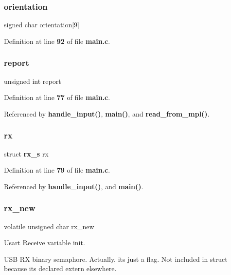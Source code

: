 \subsubsection{orientation}
{\footnotesize\ttfamily signed char orientation[9]}



Definition at line \textbf{ 92} of file \textbf{ main.\+c}.

\mbox{\label{group__eMPL_ga5ab95f126fb29c3c65d6f4aa4944a2f7}} 
\subsubsection{report}
{\footnotesize\ttfamily unsigned int report}



Definition at line \textbf{ 77} of file \textbf{ main.\+c}.



Referenced by \textbf{ handle\+\_\+input()}, \textbf{ main()}, and \textbf{ read\+\_\+from\+\_\+mpl()}.

\mbox{\label{group__eMPL_ga02c35d11f6cb2fd88475c231ddf6afce}} 
\subsubsection{rx}
{\footnotesize\ttfamily struct \textbf{ rx\+\_\+s} rx}



Definition at line \textbf{ 79} of file \textbf{ main.\+c}.



Referenced by \textbf{ handle\+\_\+input()}, and \textbf{ main()}.

\mbox{\label{group__eMPL_ga5bfb2c29b84492416fe0a885d4664132}} 
\subsubsection{rx\+\_\+new}
{\footnotesize\ttfamily volatile unsigned char rx\+\_\+new}



Usart Receive variable init. 

U\+SB RX binary semaphore. Actually, it\textquotesingle{}s just a flag. Not included in struct because it\textquotesingle{}s declared extern elsewhere. 

